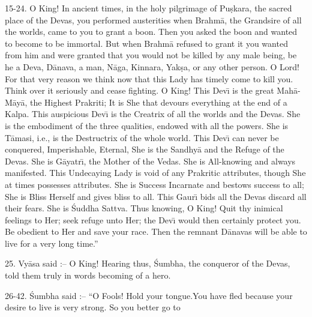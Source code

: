 15-24. O King! In ancient times, in the holy pilgrimage of Pu\d{s}kara, the sacred place of the Devas, you performed austerities when Brahm\=a, the Grandsire of all the worlds, came to you to grant a boon. Then you asked the boon and wanted to become to be immortal. But when Brahm\=a refused to grant it you wanted from him and were granted that you would not be killed by any male being, be he a Deva, D\=anava, a man, N\=aga, Kinnara, Yak\d{s}a, or any other person. O Lord! For that very reason we think now that this Lady has timely come to kill you. Think over it seriously and cease fighting. O King! This Dev\={\i} is the great Mah\=a-M\=ay\=a, the Highest Prakriti; It is She that devours everything at the end of a Kalpa. This auspicious Dev\={\i} is the Creatrix of all the worlds and the Devas. She is the embodiment of the three qualities, endowed with all the powers. She is T\=amasi, i.e., is the Destructrix of the whole world. This Dev\={\i} can never be conquered, Imperishable, Eternal, She is the Sandhy\=a and the Refuge of the Devas. She is G\=ayatr\={\i}, the Mother of the Vedas. She is All-knowing and always manifested. This Undecaying Lady is void of any Prakritic attributes, though She at times possesses attributes. She is Success Incarnate and bestows success to all; She is Bliss Herself and gives bliss to all. This Gaur\={\i} bids all the Devas discard all their fears. She is \'Suddha Sattva. Thus knowing, O King! Quit thy inimical feelings to Her; seek refuge unto Her; the Dev\={\i} would then certainly protect you. Be obedient to Her and save your race. Then the remnant D\=anavas will be able to live for a very long time.''

25. Vy\=asa said :-- O King! Hearing thus, \'Sumbha, the conqueror of the Devas, told them truly in words becoming of a hero.

26-42. \'Sumbha said :-- ``O Fools! Hold your tongue.You have fled because your desire to live is very strong. So you better go to


